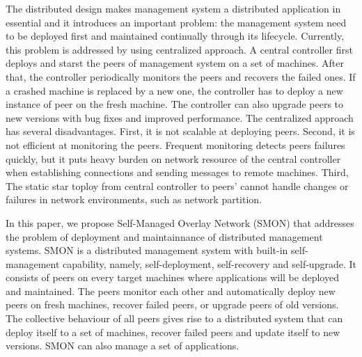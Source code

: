 The distributed design makes management system a distributed
application in essential and it introduces an important
problem: the management system need to be deployed first and
maintained continually through its lifecycle. Currently,
this problem is addressed by using centralized approach. A
central controller first deploys and starst the peers of
management system on a set of machines. After that, the
controller periodically monitors the peers and recovers the
failed ones. If a crashed machine is replaced by a new one,
the controller has to deploy a new instance of peer on the
fresh machine. The controller can also upgrade peers to new
versions with bug fixes and improved performance. The
centralized approach has several disadvantages. First, it is
not scalable at deploying peers. Second, it is not efficient
at monitoring the peers. Frequent monitoring detects peers
failures quickly, but it puts heavy burden on network
resource of the central controller when establishing
connections and sending messages to remote machines. Third,
The static star toploy from central controller to peers'
cannot handle changes or failures in network
environments, such as network partition.

In this paper, we propose Self-Managed Overlay Network
(SMON) that addresses the problem of deployment and
maintainnance of distributed management systems. SMON is a
distributed management system with built-in self-management
capability, namely, self-deployment, self-recovery and
self-upgrade. It consists of peers on every target machines
where applications will be deployed and maintained. The
peers monitor each other and automatically deploy new peers
on fresh machines, recover failed peers, or upgrade peers of
old versions. The collective behaviour of all peers gives
rise to a distributed system that can deploy itself to a set
of machines, recover failed peers and update itself to new
versions. SMON can also manage a set of applications.



